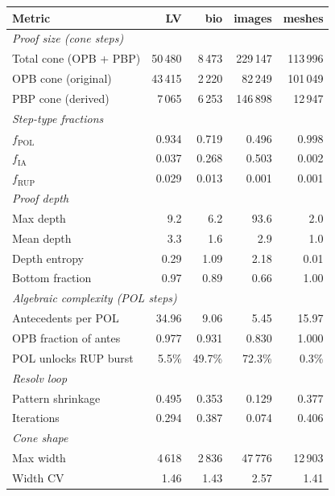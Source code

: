 \documentclass[11pt,a4paper]{article}
\begin{document}
\begin{table}[h]
\centering
\renewcommand{\arraystretch}{1.15}
\begin{tabular}{lrrrr}
\toprule
Metric & LV & bio & images & meshes \\
\midrule
\multicolumn{5}{l}{\emph{Proof size (cone steps)}} \\
\quad Total cone (OPB + PBP)    & 50\,480 & 8\,473 & 229\,147 & 113\,996 \\
\quad OPB cone (original)       & 43\,415 &  2\,220 &  82\,249 & 101\,049 \\
\quad PBP cone (derived)        &  7\,065 &  6\,253 & 146\,898 &  12\,947 \\
\midrule
\multicolumn{5}{l}{\emph{Step-type fractions}} \\
\quad $f_{\mathrm{POL}}$   & 0.934 & 0.719 & 0.496 & 0.998 \\
\quad $f_{\mathrm{IA}}$    & 0.037 & 0.268 & 0.503 & 0.002 \\
\quad $f_{\mathrm{RUP}}$   & 0.029 & 0.013 & 0.001 & 0.001 \\
\midrule
\multicolumn{5}{l}{\emph{Proof depth}} \\
\quad Max depth              &   9.2 &   6.2 &  93.6 &   2.0 \\
\quad Mean depth             &   3.3 &   1.6 &   2.9 &   1.0 \\
\quad Depth entropy          &  0.29 &  1.09 &  2.18 &  0.01 \\
\quad Bottom fraction        &  0.97 &  0.89 &  0.66 &  1.00 \\
\midrule
\multicolumn{5}{l}{\emph{Algebraic complexity (POL steps)}} \\
\quad Antecedents per POL    & 34.96 &  9.06 &  5.45 & 15.97 \\
\quad OPB fraction of antes  &  0.977 & 0.931 & 0.830 & 1.000 \\
\quad POL unlocks RUP burst  & 5.5\% & 49.7\% & 72.3\% & 0.3\% \\
\midrule
\multicolumn{5}{l}{\emph{Resolv loop}} \\
\quad Pattern shrinkage      &  0.495 &  0.353 &  0.129 &  0.377 \\
\quad Iterations             &  0.294 &  0.387 &  0.074 &  0.406 \\
\midrule
\multicolumn{5}{l}{\emph{Cone shape}} \\
\quad Max width              & 4\,618 & 2\,836 & 47\,776 & 12\,903 \\
\quad Width CV               &  1.46  &  1.43  &   2.57  &   1.41  \\

\end{tabular}
\end{table}
\end{document}
